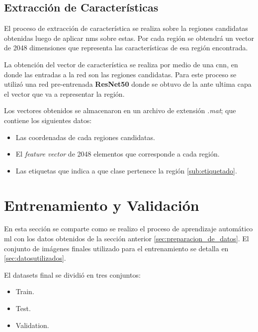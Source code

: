 \subsection{Extracción de Características}\label{sub:extracciondecaracteristica}

El proceso de extracción de característica se realiza sobre la regiones candidatas obtenidas luego de aplicar \ac{nms} sobre estas. Por cada región se obtendrá un vector de 2048 dimensiones que representa las características de esa región encontrada.

La obtención del vector de característica se realiza por medio de una \ac{cnn}, en donde las entradas a la red son las regiones candidatas. Para este proceso se utilizó una red pre-entrenada \textbf{ResNet50} donde se obtuvo de la ante ultima capa el vector que va a representar la región.

Los vectores obtenidos se almacenaron en un archivo de extensión \textit{.mat}; que contiene los siguientes datos:
\begin{itemize}
 \item Las coordenadas de cada regiones candidatas.
 \item El \textit{feature vector} de 2048 elementos que corresponde a cada región. 
 \item Las etiquetas que indica a que clase pertenece la región \ref{sub:etiquetado}.
\end{itemize}





\section{Entrenamiento y Validación}\label{sec:entrenamiento}

En esta sección se comparte como se realizo el proceso de aprendizaje automático \ac{ml} con los datos obtenidos de la sección anterior \ref{sec:preparacion_de_datos}. El conjunto de imágenes finales utilizado para el entrenamiento se detalla en \ref{sec:datosutilizados}.

El datasets final se dividió en tres conjuntos:
\begin{itemize}
\item Train.
\item Test.
\item Validation.
\end{itemize}

